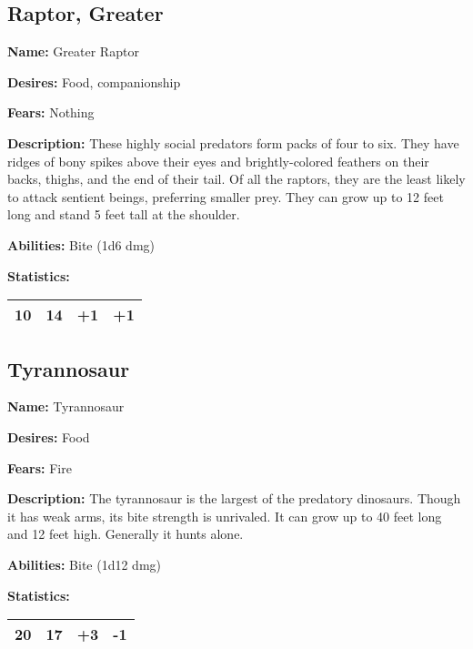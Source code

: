 \begin{multicols}{2}
\subsection{Raptor, Greater}

\textbf{Name:} Greater Raptor

\textbf{Desires:} Food, companionship

\textbf{Fears:} Nothing

\textbf{Description:} These highly social predators form packs of four to six. They
have ridges of bony spikes above their eyes and brightly-colored feathers on their
backs, thighs, and the end of their tail. Of all the raptors, they are the least
likely to attack sentient beings, preferring smaller prey. They can grow up to 12
feet long and stand 5 feet tall at the shoulder.

\textbf{Abilities:} Bite (1d6 dmg)

\textbf{Statistics:}

\begin{center}
{
\begin{xtabular}{|l|l|l|l|}
10 & 14 & +1 & +1 \\
\hline
\end{xtabular}
}
\end{center}

\subsection{Tyrannosaur}

\textbf{Name:} Tyrannosaur

\textbf{Desires:} Food

\textbf{Fears:} Fire

\textbf{Description:} The tyrannosaur is the largest of the predatory dinosaurs. Though
it has weak arms, its bite strength is unrivaled. It can grow up to 40 feet long and 12
feet high. Generally it hunts alone.

\textbf{Abilities:} Bite (1d12 dmg)

\textbf{Statistics:}

\begin{center}
{
\begin{xtabular}{|l|l|l|l|}
20 & 17 & +3 & -1 \\
\hline
\end{xtabular}
}
\end{center}


\end{multicols}
